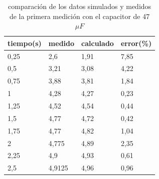 \documentclass[journal]{IEEEtran}
\begin{document}
\begin{table}[]
	\centering
	\caption{comparación de los datos simulados y medidos de la primera medición con el capacitor de 47 \(\mu F\)}
	\label{Table:Medicion1}
	\begin{tabular}{llll}
		\hline
		\multicolumn{1}{|l|}{tiempo(s)} & \multicolumn{1}{l|}{medido} & \multicolumn{1}{l|}{calculado} & \multicolumn{1}{l|}{error(\%)} \\ \hline
		\multicolumn{1}{|l|}{0,25}      & \multicolumn{1}{l|}{2,6}   & \multicolumn{1}{l|}{1,91}      & \multicolumn{1}{l|}{7,85}      \\ \hline
		\multicolumn{1}{|l|}{0,5}      & \multicolumn{1}{l|}{3,21}   & \multicolumn{1}{l|}{3,08}      & \multicolumn{1}{l|}{4,22}       \\ \hline
		\multicolumn{1}{|l|}{0,75}      & \multicolumn{1}{l|}{3,88}   & \multicolumn{1}{l|}{3,81}      & \multicolumn{1}{l|}{1,84}       \\ \hline
		\multicolumn{1}{|l|}{1}      & \multicolumn{1}{l|}{4,28}   & \multicolumn{1}{l|}{4,27}      & \multicolumn{1}{l|}{0,23}      \\ \hline
		\multicolumn{1}{|l|}{1,25}      & \multicolumn{1}{l|}{4,52}    & \multicolumn{1}{l|}{4,54}      & \multicolumn{1}{l|}{0,44}      \\ \hline
		\multicolumn{1}{|l|}{1,5}      & \multicolumn{1}{l|}{4,77}    & \multicolumn{1}{l|}{4,72}      & \multicolumn{1}{l|}{0,42}       \\ \hline
		\multicolumn{1}{|l|}{1,75}      & \multicolumn{1}{l|}{4,77}   & \multicolumn{1}{l|}{4,82}      & \multicolumn{1}{l|}{1,04}      \\ \hline
		\multicolumn{1}{|l|}{2}      & \multicolumn{1}{l|}{4,775}    & \multicolumn{1}{l|}{4,89}      & \multicolumn{1}{l|}{2,35}      \\ \hline
		\multicolumn{1}{|l|}{2,25}      & \multicolumn{1}{l|}{4,9}   & \multicolumn{1}{l|}{4,93}      & \multicolumn{1}{l|}{0,61}      \\ \hline
		\multicolumn{1}{|l|}{2,5}       & \multicolumn{1}{l|}{4,9125}   & \multicolumn{1}{l|}{4,96}      & \multicolumn{1}{l|}{0,96}       \\ \hline
	\end{tabular}
\end{table}
\end{document}
